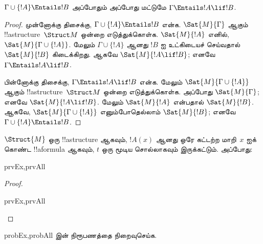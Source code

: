 \documentclass[../../../include/open-logic-section]{subfiles}
\begin{document}
\begin{thm}[பொருண்மை நிறுவல் தேற்றம்]
$\Gamma \cup \{!A\} \Entails !B$ அப்போதும் அப்போது மட்டுமே $\Gamma \Entails !A \lif !B$.
\end{thm}

\begin{proof}
முன்னோக்கு திசைக்கு, $\Gamma \cup \{ !A \} \Entails !B$ என்க.
$\Sat{M}{\Gamma}$ ஆகும் !!a{structure}~$\Struct M$ ஒன்றை எடுத்துக்கொள்க.
$\Sat{M}{!A}$ எனில், $\Sat{M}{\Gamma \cup \{ !A \} }$. மேலும்
$\Gamma \cup \{ !A \}$ ஆனது $!B$ ஐ உட்கிடையச் செய்வதால்
$\Sat{M}{!B}$ கிடைக்கிறது. ஆகவே $\Sat{M}{!A \lif !B}$; எனவே
$\Gamma \Entails !A \lif !B$.

பின்னோக்கு திசைக்கு, $\Gamma \Entails !A \lif !B$ என்க. மேலும்
$\Sat{M}{\Gamma \cup \{ !A \}}$ ஆகும் !!a{structure}~$\Struct M$
ஒன்றை எடுத்துக்கொள்க. அப்போது $\Sat{M}{\Gamma}$; எனவே
$\Sat{M}{!A \lif !B}$. மேலும் $\Sat{M}{!A}$ என்பதால் $\Sat{M}{!B}$.
ஆகவே, $\Sat{M}{\Gamma \cup \{ !A \} }$ எனும்போதெல்லாம்
$\Sat{M}{!B}$; எனவே $\Gamma \cup \{ !A \} \Entails !B$.
\end{proof}

\begin{prop}
  $\Struct{M}$ ஒரு !!a{structure} ஆகவும், $!A(x)$ ஆனது ஒரே கட்டற்ற
  மாறி~$x$ ஐக் கொண்ட !!a{formula} ஆகவும், $t$ ஒரு மூடிய சொல்லாகவும்
  இருக்கட்டும். அப்போது:
  \begin{tagenumerate}{prvEx,prvAll}
  \end{tagenumerate}
\end{prop}

\begin{proof}
  \begin{tagenumerate}{prvEx,prvAll}
  \end{tagenumerate}
\end{proof}

\begin{probtag}{probEx,probAll}
   இன் நிரூபணத்தை நிறைவுசெய்க.
\end{probtag} 
\end{document}
